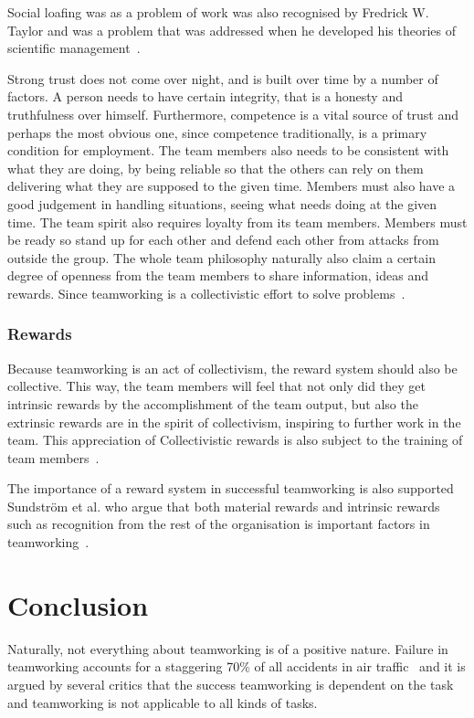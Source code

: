 \documentclass[a4paper,12pt,titlepage]{article}
\begin{document}
  Social loafing was as a problem of work was also recognised
  by Fredrick W. Taylor and was a problem that was addressed
  when he developed his theories of scientific
  management~\cite[98]{hb}.

  Strong trust does not come over night, and is built over time by
  a number of factors. A person needs to have certain integrity,
  that is a honesty and truthfulness over himself. Furthermore,
  competence is a vital source of trust and perhaps the most
  obvious one, since competence traditionally, is a primary condition
  for employment. The team members also needs to be consistent with
  what they are doing, by being reliable so that the others can
  rely on them delivering what they are supposed to the given time.
  Members must also have a good judgement in handling
  situations, seeing what needs doing at the given time. The team spirit
  also requires loyalty from its team members. Members must be ready
  so stand up for each other and defend each other from attacks from
  outside the group. The whole team philosophy naturally also claim
  a certain degree of openness from the team members to share
  information, ideas and rewards. Since teamworking is a collectivistic
  effort to solve problems~\cite[294]{sr}.

  \subsubsection{Rewards}
  Because teamworking is an act of collectivism, the reward system
  should also be collective. This way, the team members will feel
  that not only did they get intrinsic rewards by the accomplishment
  of the team output, but also the extrinsic rewards are
  in the spirit of collectivism, inspiring to further work in the
  team. This appreciation of Collectivistic rewards is also
  subject to the training of team members~\cite[293-7]{sr}.

  The importance of a reward system in successful teamworking
  is also supported Sundstr\"{o}m et al. who argue that both
  material rewards and intrinsic rewards such as recognition
  from the rest of the organisation is important factors
  in teamworking~\cite[396]{ahdb}.
  
  \section{Conclusion}
  Naturally, not everything about teamworking is of a positive nature.
  Failure in teamworking accounts for a staggering 70\%
  of all accidents in air traffic~\cite[374]{ahdb} and it is
  argued by several critics that the success teamworking is dependent
  on the task and teamworking is not applicable to all kinds of tasks. 
\end{document}
